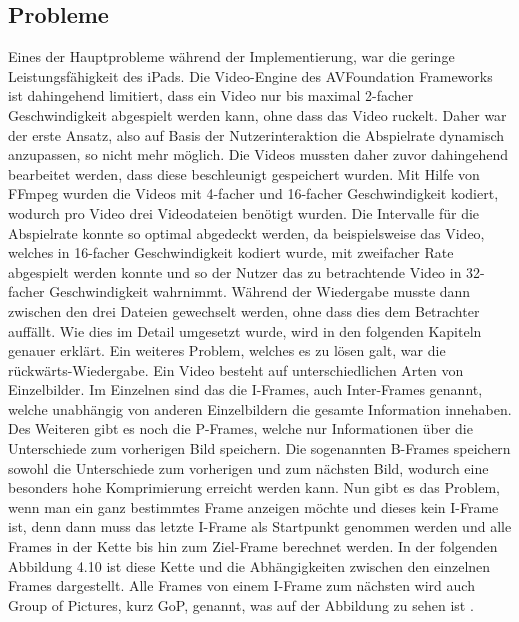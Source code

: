 \documentclass[11pt,a4paper]{report}
\begin{document}
\subsection{Probleme}

Eines der Hauptprobleme während der Implementierung, war die geringe Leistungsfähigkeit des iPads. Die Video-Engine des AVFoundation Frameworks ist dahingehend limitiert, dass ein Video nur bis maximal 2-facher Geschwindigkeit abgespielt werden kann, ohne dass das Video ruckelt. Daher war der erste Ansatz, also auf Basis der Nutzerinteraktion die Abspielrate dynamisch anzupassen, so nicht mehr möglich. Die Videos mussten daher zuvor dahingehend bearbeitet werden, dass diese beschleunigt gespeichert wurden. Mit Hilfe von FFmpeg wurden die Videos mit 4-facher und 16-facher Geschwindigkeit kodiert, wodurch pro Video drei Videodateien benötigt wurden. Die Intervalle für die Abspielrate konnte so optimal abgedeckt werden, da beispielsweise das Video, welches in 16-facher Geschwindigkeit kodiert wurde, mit zweifacher Rate abgespielt werden konnte und so der Nutzer das zu betrachtende Video in 32-facher Geschwindigkeit wahrnimmt. Während der Wiedergabe musste dann zwischen den drei Dateien gewechselt werden, ohne dass dies dem Betrachter auffällt. Wie dies im Detail umgesetzt wurde, wird in den folgenden Kapiteln genauer erklärt. Ein weiteres Problem, welches es zu lösen galt, war die rückwärts-Wiedergabe. Ein Video besteht auf unterschiedlichen Arten von Einzelbilder. Im Einzelnen sind das die I-Frames, auch Inter-Frames genannt, welche unabhängig von anderen Einzelbildern die gesamte Information innehaben. Des Weiteren gibt es noch die P-Frames, welche nur Informationen über die Unterschiede zum vorherigen Bild speichern. Die sogenannten B-Frames speichern sowohl die Unterschiede zum vorherigen und zum nächsten Bild, wodurch eine besonders hohe Komprimierung erreicht werden kann. Nun gibt es das Problem, wenn man ein ganz bestimmtes Frame anzeigen möchte und dieses kein I-Frame ist, denn dann muss das letzte I-Frame als Startpunkt genommen werden und alle Frames in der Kette bis hin zum Ziel-Frame berechnet werden. In der folgenden Abbildung 4.10 ist diese Kette und die Abhängigkeiten zwischen den einzelnen Frames dargestellt. Alle Frames von einem I-Frame zum nächsten wird auch Group of Pictures, kurz GoP, genannt, was auf der Abbildung zu sehen ist \cite{wu2005guidelines}.
\end{document}

